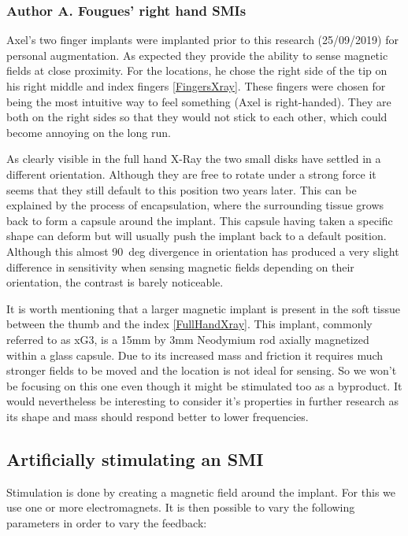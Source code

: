 \documentclass[10pt,journal,compsoc]{IEEEtran}
\begin{document}
		\subsubsection{Author A. Fougues' right hand SMIs}
		Axel's two finger implants  were implanted prior to this research (25/09/2019) for personal augmentation. As expected they provide the ability to sense magnetic fields at close proximity. For the locations, he chose the right side of the tip on his right middle and index fingers \ref{FingersXray}. These fingers were chosen for being the most intuitive way to feel something (Axel is right-handed). They are both on the right sides so that they would not stick to each other, which could become annoying on the long run.
		
		As clearly visible in the full hand X-Ray the two small disks have settled in a different orientation. Although they are free to rotate under a strong force it seems that they still default to this position two years later. This can be explained by the process of encapsulation, where the surrounding tissue grows back to form a capsule around the implant. This capsule having taken a specific shape can deform but will usually push the implant back to a default position.
		Although this almost 90~deg divergence in orientation has produced a very slight difference in sensitivity when sensing magnetic fields depending on their orientation, the contrast is barely noticeable.
			
		It is worth mentioning that a larger magnetic implant is present in the soft tissue between the thumb and the index \ref{FullHandXray}. This implant, commonly referred to as xG3, is a 15mm by 3mm Neodymium rod axially magnetized within a glass capsule. Due to its increased mass and friction it requires much stronger fields to be moved and the location is not ideal for sensing. So we won't be focusing on this one even though it might be stimulated too as a byproduct. It would nevertheless be interesting to consider it's properties in further research as its shape and mass should respond better to lower frequencies.
			
	\subsection{Artificially stimulating an SMI}
	Stimulation is done by creating a magnetic field around the implant. For this we use one or more electromagnets. It is then possible to vary the following parameters in order to vary the feedback:
	
\end{document}
